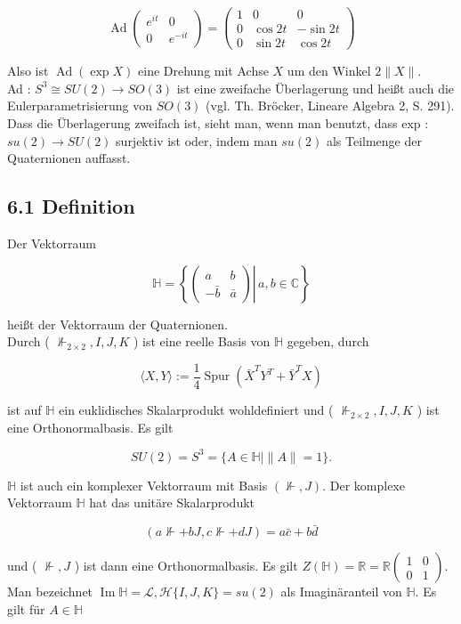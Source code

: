 \documentclass[10pt, letterpaper]{article}
\begin{document}
$$
\operatorname{Ad}\left(\begin{array}{cc}
e^{i t} & 0 \\
0 & e^{-i t}
\end{array}\right)=\left(\begin{array}{ccc}
1 & 0 & 0 \\
0 & \cos 2 t & -\sin 2 t \\
0 & \sin 2 t & \cos 2 t
\end{array}\right)
$$

Also ist $\operatorname{Ad}(\exp X)$ eine Drehung mit Achse $X$ um den Winkel $2\|X\|$.\\
Ad : $S^{3} \cong S U(2) \rightarrow S O(3)$ ist eine zweifache Überlagerung und heißt auch die Eulerparametrisierung von $S O(3)$ (vgl. Th. Bröcker, Lineare Algebra 2, S. 291). Dass die Überlagerung zweifach ist, sieht man, wenn man benutzt, dass exp : $s u(2) \rightarrow S U(2)$ surjektiv ist oder, indem man $s u(2)$ als Teilmenge der Quaternionen auffasst.

\subsection*{6.1 Definition}
Der Vektorraum

$$
\mathbb{H}=\left\{\left.\left(\begin{array}{cc}
a & b \\
-\bar{b} & \bar{a}
\end{array}\right) \right\rvert\, a, b \in \mathbb{C}\right\}
$$

heißt der Vektorraum der Quaternionen.\\
Durch ( $\nVdash_{2 \times 2}, I, J, K$ ) ist eine reelle Basis von $\mathbb{H}$ gegeben, durch

$$
\langle X, Y\rangle:=\frac{1}{4} \operatorname{Spur}\left(\bar{X}^{T} Y^{T}+\bar{Y}^{T} X\right)
$$

ist auf $\mathbb{H}$ ein euklidisches Skalarprodukt wohldefiniert und ( $\nVdash_{2 \times 2}, I, J, K$ ) ist eine Orthonormalbasis. Es gilt

$$
S U(2)=S^{3}=\{A \in \mathbb{H} \mid\|A\|=1\} .
$$

$\mathbb{H}$ ist auch ein komplexer Vektorraum mit Basis $(\nVdash, J)$. Der komplexe Vektorraum $\mathbb{H}$ hat das unitäre Skalarprodukt

$$
(a \nVdash+b J, c \nVdash+d J)=a \bar{c}+b \bar{d}
$$

und ( $\nVdash, J$ ) ist dann eine Orthonormalbasis. Es gilt $Z(\mathbb{H})=\mathbb{R}=\mathbb{R}\left(\begin{array}{ll}1 & 0 \\ 0 & 1\end{array}\right)$. Man bezeichnet $\operatorname{Im} \mathbb{H}=\mathcal{L}, \mathcal{H}\{I, J, K\}=s u(2)$ als Imaginäranteil von $\mathbb{H}$. Es gilt für $A \in \mathbb{H}$
\end{document}
